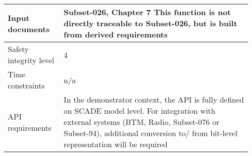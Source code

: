 \begin{longtable}{p{}p{}}
\\

\midrule
Input documents	& 
Subset-026, Chapter 7\newline
\newline
This function is not directly traceable to Subset-026, but is built from derived requirements\\
\midrule
Safety integrity level		& 4 \\
\midrule
Time constraints		& n/a  \\
\midrule
API requirements 		& In the demonstrator context, the API is fully defined on SCADE model level. For integration with external systems (BTM, Radio, Subset-076 or Subset-94), additional conversion to/ from bit-level representation will be required\\
\bottomrule
\end{longtable}

